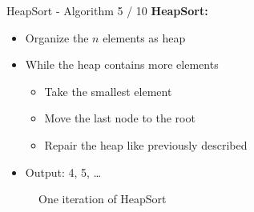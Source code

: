 \begin{frame}{HeapSort - Algorithm 5 / 10}
  \textbf{HeapSort:}
  \begin{itemize}
    \item
      Organize the {\color{Mittel-Blau}$n$} elements as heap
    \item
      While the heap contains more elements
      \begin{itemize}
        \item
          Take the smallest element
        \item
          Move the last node to the root
        \item
          Repair the heap like previously described
      \end{itemize}
    \item
      Output: {\color{Mittel-Gruen}4}, {\color{Mittel-Gruen}5},
      {\color{Mittel-Gruen}\ldots}
  \end{itemize}
  \vspace*{-0.5em}
  \begin{center}
    \begin{figure}[!h]%
      \begin{columns}%
        \begin{column}{0.33\textwidth}%
          \begin{minipage}{\textwidth}%
            \begin{center}%
            \end{center}%
          \end{minipage}%
        \end{column}%
        \begin{column}{0.33\textwidth}%
          \begin{minipage}{\textwidth}%
            \begin{center}%
            \end{center}%
          \end{minipage}%
        \end{column}%
        \begin{column}{0.33\textwidth}%
          \begin{minipage}{\textwidth}%
            \begin{center}%
            \end{center}%
          \end{minipage}%
        \end{column}%
      \end{columns}%
      \caption{One iteration of HeapSort}%
      \label{fig:heapsort_repair}%
    \end{figure}
  \end{center}
\end{frame}

